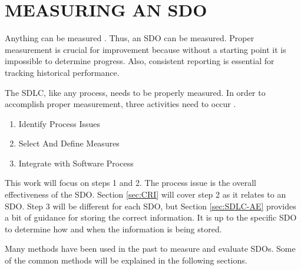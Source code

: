 \documentclass[SDSUThesis.tex]{subfiles}
\begin{document}
\section{MEASURING AN SDO}

    Anything can be measured \cite{Hubbard2010}.  Thus, an SDO can be 
    measured.  Proper measurement is crucial for improvement because
    without a starting point it is impossible to determine progress.
    Also, consistent reporting is essential for 
    tracking historical performance.  
    
    The SDLC, like any process, needs to be properly measured.  In
    order to accomplish proper measurement, three activities need
    to occur \cite{florac1999}.  
    
    \begin{enumerate}
        \item Identify Process Issues
        \item Select And Define Measures
        \item Integrate with Software Process
    \end{enumerate}
    
    This work will focus on steps 1 and 2.  The process issue is the overall
    effectiveness of the SDO.  Section \ref{sec:CRI} will cover step 2 as
    it relates to an SDO.  Step
    3 will be different for each SDO, but Section \ref{sec:SDLC-AE} provides
    a bit of guidance for storing the correct information.  It is up to the
    specific SDO to determine how and when the information is being stored.

    Many methods have been  used in the past 
    to measure and evaluate SDOs.  Some of the common methods
    will be explained in the following sections. 
\end{document}
